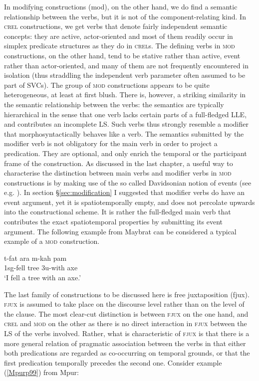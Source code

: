 In modifying constructions (\acs{mod}), on the other hand, we do find a semantic relationship between the verbs, but it is not of the component-relating kind. In \textsc{crel} constructions, we get verbs that denote fairly independent semantic concepts: they are active, actor-oriented and most of them readily occur in simplex predicate structures as they do in \textsc{crel}s. The defining verbs in \textsc{mod} constructions, on the other hand, tend to be stative rather than active, event rather than actor-oriented, and many of them are not frequently encountered in isolation (thus straddling the independent verb parameter often assumed to be part of SVCs). The group of \textsc{mod} constructions appears to be quite heterogeneous, at least at first blush. There is, however, a striking similarity in the semantic relationship between the verbs: the semantics are typically hierarchical in the sense that one verb lacks certain parts of a full-fledged LLE, and contributes an incomplete LS. Such verbs thus strongly resemble a modifier that morphosyntactically behaves like a verb. The semantics submitted by the modifier verb is not obligatory for the main verb in order to project a predication. They are optional, and only enrich the temporal or the participant frame of the construction. As discussed in the last chapter, a useful way to characterise the distinction between main verbs and modifier verbs in \textsc{mod} constructions is by making use of the so called Davidsonian notion of events (see e.g. \cite{maienborn2011event}). In section §\ref{sec:modification} I suggested that modifier verbs do have an event argument, yet it is spatiotemporally empty, and does not percolate upwards into the constructional scheme. It is rather the full-fledged main verb that contributes the exact spatiotemporal properties by submitting its event argument. The following example from Maybrat can be considered a typical example of a \textsc{mod} construction. 

\ea \label{}
\gll t-fat ara m-kah pam \\
1\acs{sg}-fell tree 3\acs{u}-with axe \\
\glft `I fell a tree with an axe.' \\ 
\z
\xe

The last family of constructions to be discussed here is free juxtaposition (\acs{fjux}). \textsc{fjux} is assumed to take place on the discourse level rather than on the level of the clause. The most clear-cut distinction is between \textsc{fjux} on the one hand, and \textsc{crel} and \textsc{mod} on the other as there is no direct interaction in \textsc{fjux} between the LS of the verbs involved. Rather, what is characteristic of \textsc{fjux} is that there is a more general relation of pragmatic association between the verbs in that either both predications are regarded as co-occurring on temporal grounds, or that the first predication temporally precedes the second one. Consider example (\ref{Mpurp99}) from Mpur:

